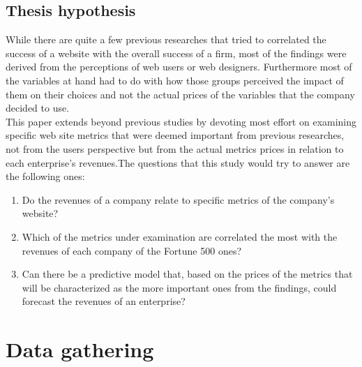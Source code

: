 \documentclass{article}
\begin{document}
\subsection{Thesis hypothesis}
While there are quite a few previous researches that tried to correlated the success of a website with the overall success of a firm, most of the findings were derived from the perceptions of web users or web designers. Furthermore most of the variables at hand had to do with how those groups perceived the impact of them on their choices and not the actual prices of the variables that the company decided to use.\\
This paper extends beyond previous studies by devoting most effort on examining specific web site metrics that were deemed important from previous researches, not from the users perspective but from the actual metrics prices in relation to each enterprise's revenues.The questions that this study would try to answer are the following ones:
\begin{enumerate}
\item Do the revenues of a company relate to specific metrics of the company's website?
\item Which of the metrics under examination are correlated the most with the revenues of each company of the Fortune 500 ones?
\item Can there be a predictive model that, based on the prices of the metrics that will be characterized as the more important ones from the findings, could forecast the revenues of an enterprise?
\end{enumerate}

\newpage
\section{Data gathering}
\end{document}
